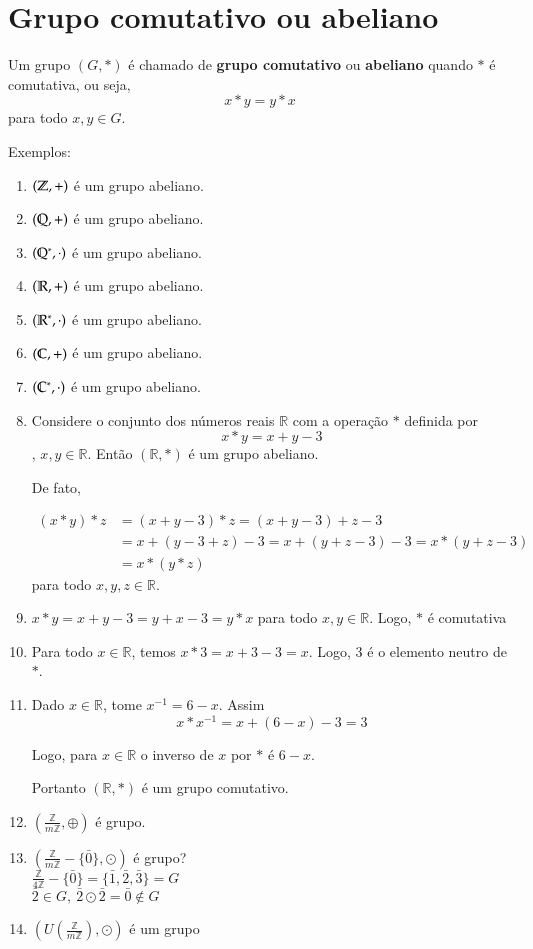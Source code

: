 \section{Grupo comutativo ou abeliano}
\begin{definicao} Um grupo $(G,*)$ {\'e} chamado de \textbf{grupo comutativo} ou \textbf{abeliano} quando $*$ {\'e} comutativa, ou seja, \[x*y=y*x\] para todo $x,y\in G$.
\end{definicao}
\vspace{1cm}

Exemplos:
\begin{enumerate}
\item $(\mathbb{Z},+)$ {\'e} um grupo abeliano.
\item $(\mathbb{Q},+)$ {\'e} um grupo abeliano.
\item $(\mathbb{Q}^*,\cdot)$ {\'e} um grupo abeliano.
\item $(\mathbb{R},+)$ {\'e} um grupo abeliano.
\item $(\mathbb{R}^*,\cdot)$ {\'e} um grupo abeliano.
\item $(\mathbb{C},+)$ {\'e} um grupo abeliano.
\item $(\mathbb{C}^*,\cdot)$ {\'e} um grupo abeliano.
\item Considere o conjunto dos n{\'u}meros reais $\mathbb{R}$ com a opera{\c c}{\~a}o $*$ definida por \[x*y=x+y-3\], $x,y\in\mathbb{R}$. Ent{\~a}o $(\mathbb{R},*)$ {\'e} um grupo abeliano.

De fato,

\begin{align*}
(x*y)*z &= (x+y-3)*z = (x+y-3)+z-3\\
&= x+(y-3+z)-3 = x+(y+z-3)-3 = x*(y+z-3)\\
&= x*(y*z)
\end{align*}
para todo $x,y,z\in \mathbb{R}$.
\item $x*y=x+y-3=y+x-3=y*x$ para todo $x,y\in\mathbb{R}$. Logo, $*$ {\'e} comutativa
\item Para todo $x\in\mathbb{R}$, temos $x*3=x+3-3=x$. Logo, 3 {\'e} o elemento neutro de $*$.
\item Dado $x\in\mathbb{R}$, tome $x^{-1}=6-x$. Assim \[x*x^{-1}=x+(6-x)-3=3\]

Logo, para $x\in\mathbb{R}$ o inverso de $x$ por $*$ {\'e} $6-x$.

Portanto $(\mathbb{R}, *)$ {\'e} um grupo comutativo.

\item $\left(\displaystyle\frac{\mathbb{Z}}{m\mathbb{Z}},\oplus\right)$ {\'e} grupo.
\item $\left(\displaystyle\frac{\mathbb{Z}}{m\mathbb{Z}}-\{\bar{0}\},\odot\right)$ {\'e} grupo?\\
$\displaystyle\frac{\mathbb{Z}}{4\mathbb{Z}}-\{\bar{0}\}=\{\bar{1},\bar{2},\bar{3}\}=G$\\
$\bar{2}\in G,\ \bar{2}\odot\bar{2}=\bar{0}\notin G$
\item $\left(U\left(\displaystyle\frac{\mathbb{Z}}{m\mathbb{Z}}\right),\odot\right)$ {\'e} um grupo\\
\end{enumerate}

